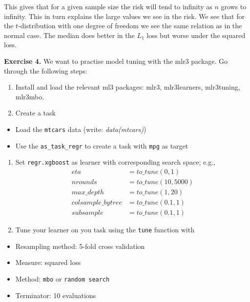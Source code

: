 \documentclass[a4paper,12pt,openany]{book}
\providecommand{\tightlist}{%
 \setlength{\itemsep}{0pt}\setlength{\parskip}{0pt}}
\begin{document}
This gives that for a given sample size the risk will tend to infinity as \(n\) grows to infinity. This in turn explains the large values we see in the risk. We see that for the \(t\)-distribution with one degree of freedom we see the same relation as in the normal case. The median does better in the \(L_1\) loss but worse under the squared loss.

\textbf{Exercise 4.} We want to practise model tuning with the mlr3 package. Go through the following steps:

\begin{enumerate}
\def\labelenumi{\arabic{enumi}.}
\tightlist
\item
  Install and load the relevant ml3 packages: mlr3, mlr3learners, mlr3tuning, mlr3mbo.
\item
  Create a task
\end{enumerate}

\begin{itemize}
\tightlist
\item
  Load the \texttt{mtcars} data (write: \emph{data(mtcars)})
\item
  Use the \texttt{as\_task\_regr} to create a task with \texttt{mpg} as target
\end{itemize}

\begin{enumerate}
\def\labelenumi{\arabic{enumi}.}
\setcounter{enumi}{2}
\tightlist
\item
  Set \texttt{regr.xgboost} as learner with corresponding search space; e.g.,
  \begin{align*}
  eta &= to\_tune(0, 1)\\
  nrounds &= to\_tune(10, 5000)\\
  max\_depth &= to\_tune(1, 20)\\
  colsample\_bytree &= to\_tune(0.1, 1)\\
  subsample &= to\_tune(0.1, 1)
  \end{align*}
\item
  Tune your learner on you task using the \texttt{tune} function with
\end{enumerate}

\begin{itemize}
\tightlist
\item
  Resampling method: 5-fold cross validation
\item
  Measure: squared loss
\item
  Method: \texttt{mbo} or \texttt{random\ search}
\item
  Terminator: 10 evaluations
\end{itemize}
\end{document}
